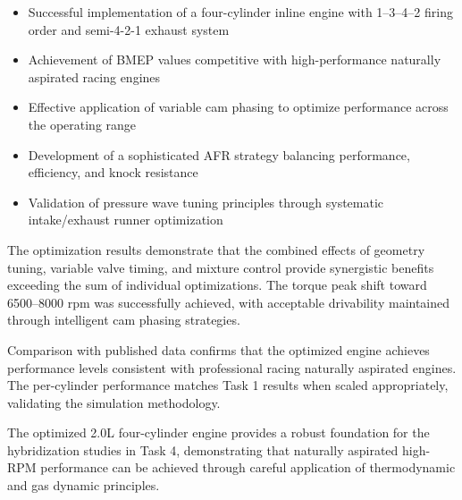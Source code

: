 \begin{itemize}
    \item Successful implementation of a four-cylinder inline engine with 1--3--4--2 firing order and semi-4-2-1 exhaust system
    \item Achievement of BMEP values competitive with high-performance naturally aspirated racing engines
    \item Effective application of variable cam phasing to optimize performance across the operating range
    \item Development of a sophisticated AFR strategy balancing performance, efficiency, and knock resistance
    \item Validation of pressure wave tuning principles through systematic intake/exhaust runner optimization
\end{itemize}

The optimization results demonstrate that the combined effects of geometry tuning, variable valve timing, and mixture control provide synergistic benefits exceeding the sum of individual optimizations. The torque peak shift toward 6500--8000 rpm was successfully achieved, with acceptable drivability maintained through intelligent cam phasing strategies.

Comparison with published data confirms that the optimized engine achieves performance levels consistent with professional racing naturally aspirated engines. The per-cylinder performance matches Task 1 results when scaled appropriately, validating the simulation methodology.

The optimized 2.0L four-cylinder engine provides a robust foundation for the hybridization studies in Task 4, demonstrating that naturally aspirated high-RPM performance can be achieved through careful application of thermodynamic and gas dynamic principles.

